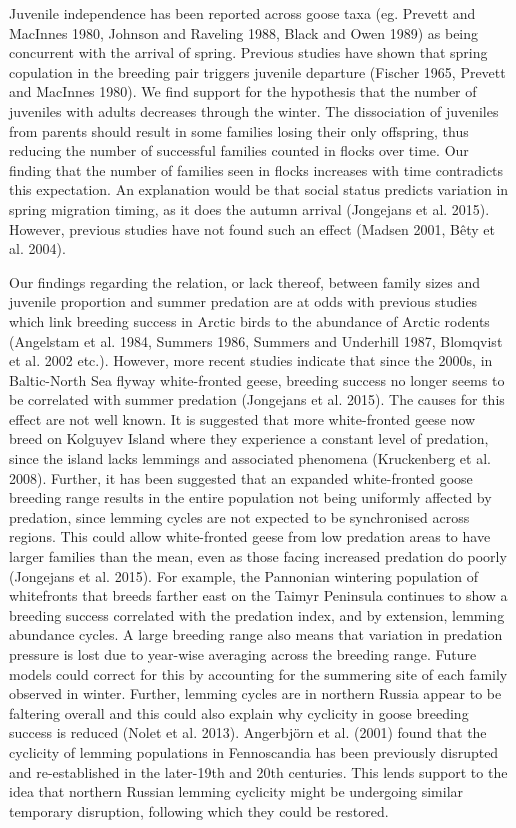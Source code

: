 \documentclass[10pt,twocolumn]{paper}
\begin{document}
Juvenile independence has been reported across goose taxa (eg. Prevett
and MacInnes 1980, Johnson and Raveling 1988, Black and Owen 1989) as
being concurrent with the arrival of spring. Previous studies have shown
that spring copulation in the breeding pair triggers juvenile departure
(Fischer 1965, Prevett and MacInnes 1980). We find support for the
hypothesis that the number of juveniles with adults decreases through
the winter. The dissociation of juveniles from parents should result in
some families losing their only offspring, thus reducing the number of
successful families counted in flocks over time. Our finding that the
number of families seen in flocks increases with time contradicts this
expectation. An explanation would be that social status predicts
variation in spring migration timing, as it does the autumn arrival
(Jongejans et al. 2015). However, previous studies have not found such
an effect (Madsen 2001, Bêty et al. 2004).

Our findings regarding the relation, or lack thereof, between family
sizes and juvenile proportion and summer predation are at odds with
previous studies which link breeding success in Arctic birds to the
abundance of Arctic rodents (Angelstam et al. 1984, Summers 1986,
Summers and Underhill 1987, Blomqvist et al. 2002 etc.). However, more
recent studies indicate that since the 2000s, in Baltic-North Sea flyway
white-fronted geese, breeding success no longer seems to be correlated
with summer predation (Jongejans et al. 2015). The causes for this
effect are not well known. It is suggested that more white-fronted geese
now breed on Kolguyev Island where they experience a constant level of
predation, since the island lacks lemmings and associated phenomena
(Kruckenberg et al. 2008). Further, it has been suggested that an
expanded white-fronted goose breeding range results in the entire
population not being uniformly affected by predation, since lemming
cycles are not expected to be synchronised across regions. This could
allow white-fronted geese from low predation areas to have larger
families than the mean, even as those facing increased predation do
poorly (Jongejans et al. 2015). For example, the Pannonian wintering
population of whitefronts that breeds farther east on the Taimyr
Peninsula continues to show a breeding success correlated with the
predation index, and by extension, lemming abundance cycles. A large
breeding range also means that variation in predation pressure is lost
due to year-wise averaging across the breeding range. Future models
could correct for this by accounting for the summering site of each
family observed in winter. Further, lemming cycles are in northern
Russia appear to be faltering overall and this could also explain why
cyclicity in goose breeding success is reduced (Nolet et al. 2013).
Angerbjörn et al. (2001) found that the cyclicity of lemming populations
in Fennoscandia has been previously disrupted and re-established in the
later-19th and 20th centuries. This lends support to the idea that
northern Russian lemming cyclicity might be undergoing similar temporary
disruption, following which they could be restored.
\end{document}
